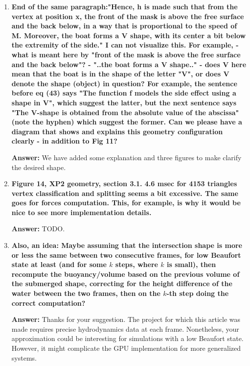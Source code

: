 \documentclass{article}
\newcommand{\answer}[1]{\textbf{\textcolor{answercolor}{Answer:}} \textcolor{answercolor}{#1}}
\begin{document}
\begin{enumerate}[label=\textbf{\arabic*.}]
	\item \textbf{End of the same paragraph:"Hence, h is made such that from the vertex at position x, the front of the mask is above the free surface and the back below, in a way that is proportional to the speed of M. Moreover, the boat forms a V shape, with its center a bit below the extremity of the side."
		      I can not visualize this. For example,
		      - what is meant here by "front of the mask is above the free surface and the back below"?
		      - "..the boat forms a V shape.." - does V here mean that the boat is in the shape of the letter "V", or does V denote the shape (object) in question? For example, the sentence before eq (43) says "The function f models the side effect using a shape in V", which suggest the latter, but the next sentence says "The V-shape is obtained from the absolute value of the abscissa" (note the hyphen) which suggest the former.
		      Can we please have a diagram that shows and explains this geometry configuration clearly - in addition to Fig 11?}

	      \answer{We have added some explanation and three figures to make clarify the desired shape.}

	\item \textbf{Figure 14, XP2 geometry, section 3.1. 4.6 msec for 4153 triangles vertex classification and splitting seems a bit excessive. The same goes for forces computation. This, for example, is why it would be nice to see more implementation details.}

	      \answer{TODO.}

	\item \textbf{Also, an idea: Maybe assuming that the intersection shape is more or less the same between two consecutive frames, for low Beaufort state at least (and for some $k$ steps, where $k$ is small), then recompute the buoyancy/volume based on the previous volume of the submerged shape, correcting for the height difference of the water between the two frames, then on the $k$-th step doing the correct computation?}

	      \answer{Thanks for your suggestion. The project for which this article was made requires precise hydrodynamics data at each frame. Nonetheless, your approximation could be interesting for simulations with a low Beaufort state. However, it might complicate the GPU implementation for more generalized systems.}


\end{enumerate}
\end{document}
